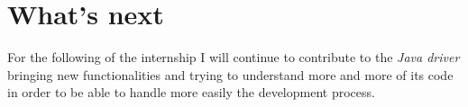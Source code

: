 \documentclass[a4paper]{report}
\newcommand{\jd}{\emph{Java driver }}
\begin{document}
\chapter{What's next}
For the following of the internship I will continue to contribute to the \jd bringing new functionalities and trying to understand more and more of its code in order to be able to handle more easily the development process.










\end{document}

